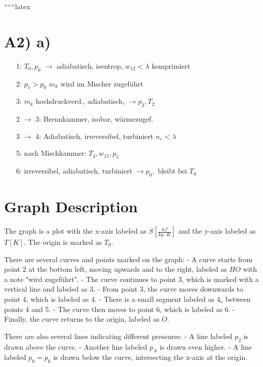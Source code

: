 
``````latex


\section*{A2) a)}

\begin{itemize}
    \item[1:] $T_0, p_0$ \hspace{1cm} $\rightarrow$ \hspace{1cm} adiabatisch, isentrop, $w_{12} < \lambda$ komprimiert
    \item[2:] $p_1 > p_0$ \hspace{1cm} $\dot{m}_k$ \hspace{1cm} wird im Mischer zugeführt
    \item[3:] $\dot{m}_k$ \hspace{1cm} hochdruckverd., adiabatisch, $\rightarrow p_2, T_2$
    \item[2 $\rightarrow$ 3:] Brennkammer, isobar, wärmezugef.
    \item[3 $\rightarrow$ 4:] Adiabatisch, irreversibel, turbiniert $n_e < \lambda$
    \item[5:] nach Mischkammer: $T_3, w_{15}, p_5$
    \item[6:] irreversibel, adiabatisch, turbiniert $\rightarrow p_0, \text{ bleibt bei } T_0$
\end{itemize}

\section*{Graph Description}

The graph is a plot with the x-axis labeled as $S \left[ \frac{kJ}{kg \cdot K} \right]$ and the y-axis labeled as $T \left[ K \right]$. The origin is marked as $T_0$. 

There are several curves and points marked on the graph:
- A curve starts from point 2 at the bottom left, moving upwards and to the right, labeled as $HO$ with a note "wird zugeführt".
- The curve continues to point 3, which is marked with a vertical line and labeled as $3$.
- From point 3, the curve moves downwards to point 4, which is labeled as $4$.
- There is a small segment labeled as $4_s$ between points 4 and 5.
- The curve then moves to point 6, which is labeled as $6$.
- Finally, the curve returns to the origin, labeled as $O$.

There are also several lines indicating different pressures:
- A line labeled $p_2$ is drawn above the curve.
- Another line labeled $p_A$ is drawn even higher.
- A line labeled $p_0 = p_6$ is drawn below the curve, intersecting the x-axis at the origin.

